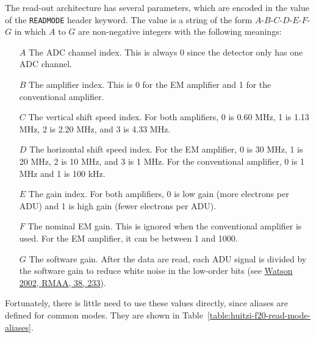 The read-out architecture has several parameters, which are encoded in the value of the \verb|READMODE| header keyword. The value is a string of the form $A$-$B$-$C$-$D$-$E$-$F$-$G$ in which $A$ to $G$ are non-negative integers with the following meanings:

\begin{itemize}
\item[$A$] The ADC channel index. This is always 0 since the detector only has one ADC channel.
\item[$B$] The amplifier index. This is 0 for the EM amplifier and 1 for the conventional amplifier.
\item[$C$] The vertical shift speed index. For both amplifiers, 0 is 0.60 MHz, 1 is 1.13 MHz, 2 is 2.20 MHz, and 3 is 4.33 MHz. 
\item[$D$] The horizontal shift speed index. For the EM amplifier, 0 is 30 MHz, 1 is 20 MHz, 2 is 10 MHz, and 3 is 1 MHz. For the conventional amplifier, 0 is 1 MHz and 1 is 100 kHz.
\item[$E$] The gain index. For both amplifiers, 0 is low gain (more electrons per ADU) and 1 is high gain (fewer electrons per ADU).
\item[$F$] The nominal EM gain. This is ignored when the conventional amplifier is used. For the EM amplifier, it can be between 1 and 1000.
\item[$G$] The software gain. After the data are read, each ADU signal is divided by the software gain to reduce white noise in the low-order bits (see \href{https://ui.adsabs.harvard.edu/abs/2002RMxAA..38..233W/abstract}{Watson 2002, RMAA, 38, 233}).
\end{itemize}

Fortunately, there is little need to use these values directly, since aliases are defined for common modes. They are shown in Table~\ref{table:huitzi-f20-read-mode-aliases}.

